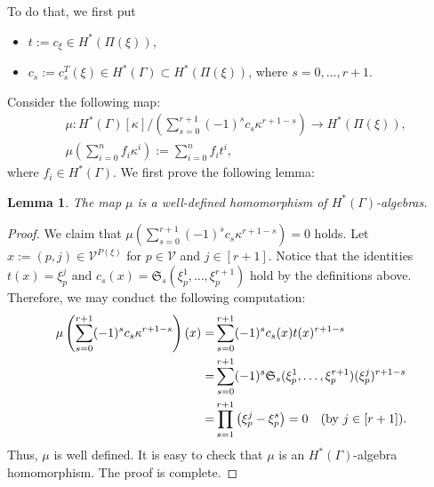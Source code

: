 \documentclass[12pt]{amsart}
\newtheorem{lemma}[theorem]{Lemma}
\theoremstyle{definition}
\theoremstyle{remark}
\numberwithin{equation}{section}
\begin{document}
To do that, we first put
\begin{itemize}
\item $t:=c_{\xi}\in H^*(\Pi(\xi))$,
\item $c_{s}:=c_{s}^{T}(\xi)\in H^*(\Gamma)\subset H^*(\Pi(\xi))$, where $s=0,\dots,r+1$.
\end{itemize}
Consider the following map:
\begin{align}
\label{the_map}
&\mu\colon H^{*}(\Gamma)[\kappa]/( \sum_{s=0}^{r+1} (-1)^{s}c_{s} \kappa^{r+1-s}) \longrightarrow H^{*}(\Pi(\xi)), \nonumber\\
&\mu\left(\sum_{i=0}^{n}f_{i}\kappa^{i}\right):=\sum_{i=0}^{n}f_{i} t^{i},
\end{align}
where $f_{i}\in H^{*}(\Gamma)$.
We first prove the following lemma:
\begin{lemma}
\label{well-defined}
The map $\mu$ is a well-defined homomorphism of $H^*(\Gamma)$-algebras.
\end{lemma}
\begin{proof}
We claim that $\mu(\sum_{s=0}^{r+1} (-1)^{s}c_{s} \kappa^{r+1-s})=0$ holds.
Let $x:=(p,j)\in \mathcal{V}^{P(\xi)}$ for $p\in \mathcal{V}$ and $j\in [r+1]$.
Notice that the identities $t(x)=\xi_{p}^{j}$ and $c_{s}(x)=\mathfrak{S}_{s}(\xi_{p}^{1},\ldots,\xi_{p}^{r+1})$ hold by the definitions above.
Therefore, we may conduct the following computation:
\begin{align*}
\mu\left(\sum_{s=0}^{r+1} (-1)^{s}c_{s} \kappa^{r+1-s}\right)(x)=&
\sum_{s=0}^{r+1} (-1)^{s}c_{s}(x) t(x)^{r+1-s}\\
=&\sum_{s=0}^{r+1}(-1)^{s}\mathfrak{S}_{s}(\xi_{p}^{1},\ldots, \xi_{p}^{r+1})(\xi_{p}^{j})^{r+1-s} \\
=&\prod_{s=1}^{r+1}\left(\xi_{p}^{j}-\xi_{p}^{s}\right) =0\quad ({\rm by}\ j\in [r+1]).
\end{align*}
Thus, $\mu$ is well defined.
It is easy to check that $\mu$ is an $H^{*}(\Gamma)$-algebra homomorphism.
The proof is complete.
\end{proof}
\end{document}
